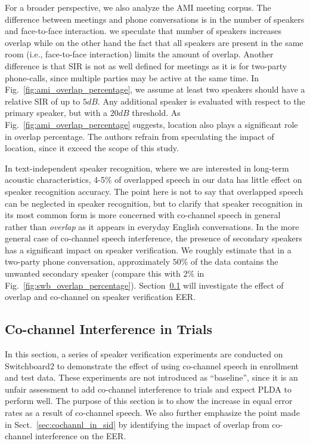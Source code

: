 For a broader perspective, we also analyze the AMI meeting corpus. 
The difference between meetings and phone conversations is in the number of speakers and face-to-face interaction. 
we speculate that number of speakers increases overlap while on the other hand the fact that all speakers are present in the same room (i.e., face-to-face interaction) limits the amount of overlap. 
Another difference is that SIR is not as well defined for meetings as it is for two-party phone-calls, since multiple parties may be active at the same time. 
In Fig.~\ref{fig:ami_overlap_percentage}, we assume at least two speakers should have a relative SIR of up to $5dB$. 
Any additional speaker is evaluated with respect to the primary speaker, but with a $20dB$ threshold. 
As Fig.~\ref{fig:ami_overlap_percentage} suggests, location also plays a significant role in overlap percentage. 
The authors refrain from speculating the impact of location, since it exceed the scope of this study. 

In text-independent speaker recognition, where we are interested in long-term acoustic characteristics, 4-5\% of overlapped speech in our data has little effect on speaker recognition accuracy. 
The point here is not to say that overlapped speech can be neglected in speaker recognition, but to clarify that speaker recognition in its most common form is more concerned with co-channel speech in general rather than {\it overlap} as it appears in everyday English conversations. 
In the more general case of co-channel speech interference, the presence of secondary speakers has a significant impact on speaker verification. 
We roughly estimate that in a two-party phone conversation, approximately $50\%$ of the data contains the unwanted secondary speaker (compare this with $2\%$ in Fig.~\ref{fig:swb_overlap_percentage}). 
Section~\ref{ssec:cch_in_trials} will investigate the effect of overlap and co-channel on speaker verification EER. 



\subsection{Co-channel Interference in Trials}
\label{ssec:cch_in_trials}
In this section, a series of speaker verification experiments are conducted on Switchboard2 to demonstrate the effect of using co-channel speech in enrollment and test data. 
These experiments are not introduced as ``baseline'', since it is an unfair assessment to add co-channel interference to trials and expect PLDA to perform well. 
The purpose of this section is to show the increase in equal error rates as a result of co-channel speech. 
We also further emphasize the point made in Sect.~\ref{sec:cochannl_in_sid} by identifying the impact of overlap from co-channel interference on the EER. 

